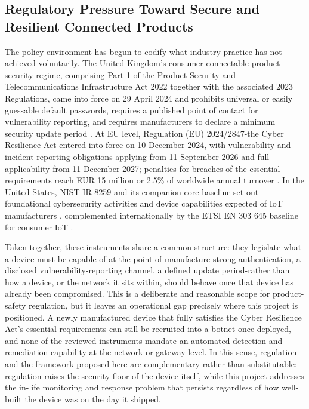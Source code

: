 \subsection{Regulatory Pressure Toward Secure and Resilient Connected Products}

The policy environment has begun to codify what industry practice has not achieved voluntarily. The United Kingdom's consumer connectable product security regime, comprising Part 1 of the Product Security and Telecommunications Infrastructure Act 2022 together with the associated 2023 Regulations, came into force on 29 April 2024 and prohibits universal or easily guessable default passwords, requires a published point of contact for vulnerability reporting, and requires manufacturers to declare a minimum security update period \cite{UKPSTI2023}. At EU level, Regulation (EU) 2024/2847-the Cyber Resilience Act-entered into force on 10 December 2024, with vulnerability and incident reporting obligations applying from 11 September 2026 and full applicability from 11 December 2027; penalties for breaches of the essential requirements reach EUR 15 million or 2.5\% of worldwide annual turnover \cite{EU2024CRA}. In the United States, NIST IR 8259 and its companion core baseline set out foundational cybersecurity activities and device capabilities expected of IoT manufacturers \cite{Fagan2020}, complemented internationally by the ETSI EN 303 645 baseline for consumer IoT \cite{ETSI303645}.

Taken together, these instruments share a common structure: they legislate what a device must be capable of at the point of manufacture-strong authentication, a disclosed vulnerability-reporting channel, a defined update period-rather than how a device, or the network it sits within, should behave once that device has already been compromised. This is a deliberate and reasonable scope for product-safety regulation, but it leaves an operational gap precisely where this project is positioned. A newly manufactured device that fully satisfies the Cyber Resilience Act's essential requirements can still be recruited into a botnet once deployed, and none of the reviewed instruments mandate an automated detection-and-remediation capability at the network or gateway level. In this sense, regulation and the framework proposed here are complementary rather than substitutable: regulation raises the security floor of the device itself, while this project addresses the in-life monitoring and response problem that persists regardless of how well-built the device was on the day it shipped.


